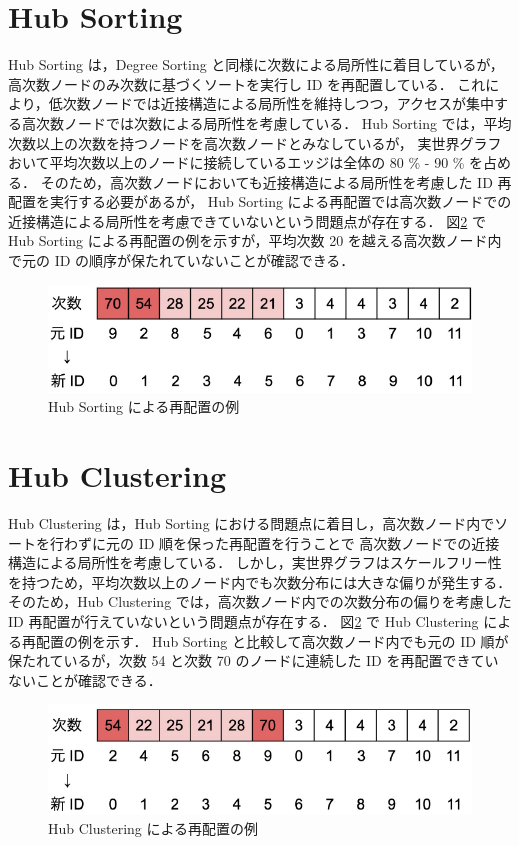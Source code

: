 \section{Hub Sorting}
Hub Sorting \cite{zhang2017making} は，Degree Sorting と同様に次数による局所性に着目しているが，高次数ノードのみ次数に基づくソートを実行し ID を再配置している．
これにより，低次数ノードでは近接構造による局所性を維持しつつ，アクセスが集中する高次数ノードでは次数による局所性を考慮している．
Hub Sorting では，平均次数以上の次数を持つノードを高次数ノードとみなしているが，
実世界グラフおいて平均次数以上のノードに接続しているエッジは全体の 80 \% - 90 \% を占める\cite{faldu2019closer}．
そのため，高次数ノードにおいても近接構造による局所性を考慮した ID 再配置を実行する必要があるが，
Hub Sorting による再配置では高次数ノードでの近接構造による局所性を考慮できていないという問題点が存在する．
図\ref{hubclustering} で Hub Sorting による再配置の例を示すが，平均次数 20 を越える高次数ノード内で元の ID の順序が保たれていないことが確認できる．
\begin{figure}[t]
  \centering
  \includegraphics[width=\linewidth]{./figure/hubsorting.pdf}
  \caption{Hub Sorting による再配置の例}
  \label{hubsorting}
\end{figure}
\section{Hub Clustering}
Hub Clustering \cite{balaji2018graph} は，Hub Sorting における問題点に着目し，高次数ノード内でソートを行わずに元の ID 順を保った再配置を行うことで
高次数ノードでの近接構造による局所性を考慮している．
しかし，実世界グラフはスケールフリー性を持つため，平均次数以上のノード内でも次数分布には大きな偏りが発生する．
そのため，Hub Clustering では，高次数ノード内での次数分布の偏りを考慮した ID 再配置が行えていないという問題点が存在する．
図\ref{hubclustering} で Hub Clustering による再配置の例を示す．
Hub Sorting と比較して高次数ノード内でも元の ID 順が保たれているが，次数 54 と次数 70 のノードに連続した ID を再配置できていないことが確認できる．
\begin{figure}[t]
  \centering
  \includegraphics[width=\linewidth]{./figure/hubclustering.pdf}
  \caption{Hub Clustering による再配置の例}
  \label{hubclustering}
\end{figure}
